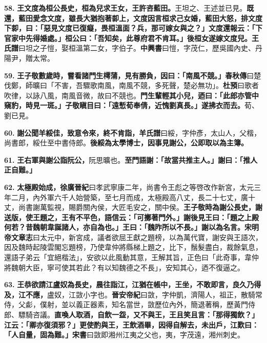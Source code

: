 \textbf{58.} \textbf{王文度為桓公長史，桓為兒求王女，王許咨藍田。}{\footnotesize 王坦之、王述並已見。}\textbf{既還，藍田愛念文度，雖長大猶抱著厀上，文度因言桓求己女婚，藍田大怒，排文度下厀，曰：「惡見文度已復癡，畏桓溫面？兵，那可嫁女與之？」文度還報云：「下官家中先得婚處。」桓公曰：「吾知矣，此尊府君不肯耳。」後桓女遂嫁文度兒。}{\footnotesize \textbf{王氏譜}曰坦之子愷，娶桓溫第二女，字伯子。\textbf{中興書}曰愷，字茂仁，歷吳國內史、丹陽尹，贈太常。}

\textbf{59.} \textbf{王子敬數歲時，嘗看諸門生樗蒲，見有勝負，因曰：「南風不競。」}{\footnotesize \textbf{春秋傳}曰楚伐鄭，師曠曰「不害，吾驟歌南風，南風不競，多死聲，楚必無功」。\textbf{杜預}曰歌者吹律，以詠八風，南風音微，故曰不競也。}\textbf{門生輩輕其小兒，迺曰：「此郎亦管中窺豹，時見一斑。」子敬瞋目曰：「遠慙荀奉倩，近愧劉真長。」遂拂衣而去。}{\footnotesize 荀、劉已見。}

\textbf{60.} \textbf{謝公聞羊綏佳，致意令來，終不肯詣，}{\footnotesize \textbf{羊氏譜}曰綏，字仲彥，太山人，父楷，尚書郎，綏仕至中書侍郎。}\textbf{後綏為太學博士，因事見謝公，公即取以為主簿。}

\textbf{61.} \textbf{王右軍與謝公詣阮公，}{\footnotesize 阮思曠也。}\textbf{至門語謝：「故當共推主人。」謝曰：「推人正自難。」}

\textbf{62.} \textbf{太極殿始成，}{\footnotesize \textbf{徐廣晉紀}曰孝武寧康二年，尚書令王彪之等啓改作新宮，太元三年二月，內外軍六千人始營築，至七月而成，太極殿高八丈，長二十七丈，廣十丈，尚書謝萬監視，賜爵關內侯，大匠毛安之，關中侯。}\textbf{王子敬時為謝公長史，謝送版，使王題之，王有不平色，語信云：「可擲著門外。」謝後見王曰：「題之上殿何若？昔魏朝韋誕諸人，亦自為也。」王曰：「魏阼所以不長。」謝以為名言。}{\footnotesize \textbf{宋明帝文章志}曰太元中，新宮成，議者欲屈王獻之題榜，以為萬代寶，謝安與王語次，因及魏時起陵雲閣忘題榜，乃使韋仲將縣梯上題之，比下，鬚髮盡白，裁餘氣息，還語子弟云「宜絕楷法」，安欲以此風動其意，王解其旨，正色曰「此奇事，韋仲將魏朝大臣，寧可使其若此？有以知魏德之不長」，安知其心，迺不復逼之。}

\textbf{63.} \textbf{王恭欲請江盧奴為長史，晨往詣江，江猶在帳中，王坐，不敢即言，良久乃得及，江不應，}{\footnotesize 盧奴，江敳小字也。\textbf{晉安帝紀}曰敳，字仲凱，濟陽人，祖正，散騎常侍，父虨，僕射，並以義正器素，知名當世，敳歷位內外，簡退著稱，歷黃門侍郎、驃騎咨議。}\textbf{直喚人取酒，自飲一盌，又不與王，王且笑且言：「那得獨飲？」江云：「卿亦復須邪？」更使酌與王，王飲酒畢，因得自解去，未出戶，江歎曰：「人自量，固為難。」}{\footnotesize \textbf{宋書}曰敳即湘州江夷之父也，夷，字茂遠，湘州刺史。}

